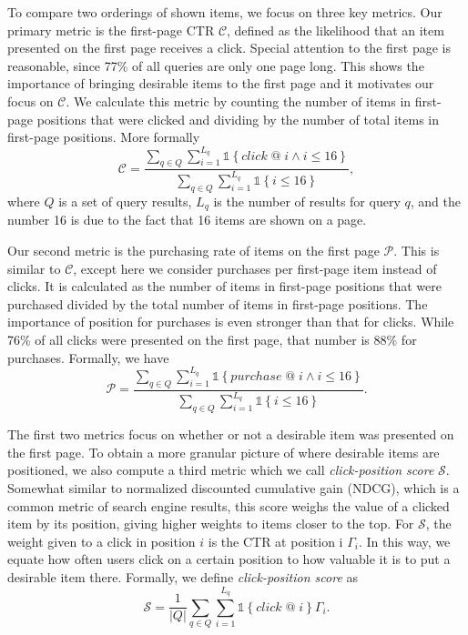 \documentclass{article}
\begin{document}
To compare two orderings of shown items, we focus on three key metrics. Our primary 
metric is the first-page CTR $\mathscr{C}$, defined as the likelihood that an item 
presented on the first page receives a click. Special attention to the first page is
reasonable, since 77\% of all queries 
are only one page long. This shows the importance of bringing desirable items to the 
first page and it motivates our focus on $\mathscr{C}$. We calculate this metric by 
counting the number of items in first-page positions that were clicked and dividing 
by the number of total items in first-page positions. More formally
\begin{equation}
    \mathscr{C} = \frac{\sum_{q \in Q}\sum_{i=1}^{L_q}\mathds{1}\left\{click\; @\; i \wedge i \leq 16\right\}}{\sum_{q \in Q}\sum_{i=1}^{L_q}\mathds{1}\left\{i \leq 16\right\}},
\end{equation}
where $Q$ is a set of query results, $L_q$ is the number of results for query $q$, and
the number 16 is due to the fact that 16 items are shown on a page.

Our second metric is the purchasing rate of items on the first page $\mathscr{P}$. This is 
similar to $\mathscr{C}$, except here we consider purchases per first-page item 
instead of clicks. It is calculated as the number of items in first-page positions that 
were purchased divided by the total number of items in first-page positions. The 
importance of position for purchases is even stronger than that for clicks. While 76\% of 
all clicks were presented on the first page, that number is 88\% for purchases. Formally,
we have
\begin{equation}
    \mathscr{P} = \frac{\sum_{q \in Q}\sum_{i=1}^{L_q}\mathds{1}\left\{purchase\; @\; i \wedge i \leq 16\right\}}{\sum_{q \in Q}\sum_{i=1}^{L_q}\mathds{1}\left\{i \leq 16\right\}}.
\end{equation}

The first two metrics focus on whether or not a desirable item was presented on the 
first page. To obtain a more granular picture of where desirable items are positioned, 
we also compute a third metric which we call {\em click-position score} $\mathscr{S}$. 
Somewhat similar to normalized discounted cumulative gain (NDCG), which is a common metric
of search engine results, this score weighs the value of a clicked item by its position, 
giving higher weights to items closer to the top. For $\mathscr{S}$, the weight given to 
a click in position $i$ is the CTR at position i $\Gamma_i$. In this way, we equate how 
often users click on a certain position to how valuable it is to put a desirable 
item there. Formally, we define {\em click-position score} as
\begin{equation}
    \mathscr{S} = \frac{1}{\left\vert{Q}\right\vert}\sum_{q \in Q}\sum_{i=1}^{L_q}\mathds{1}\left\{click\; @\; i\right\}\Gamma_i.
\end{equation}
\end{document}
